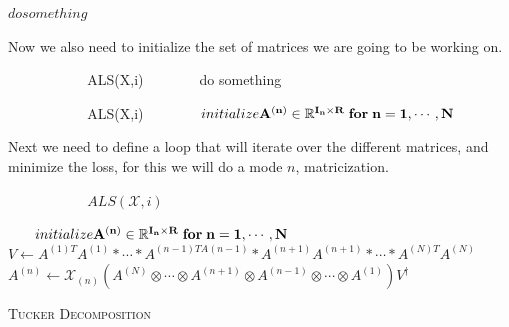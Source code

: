 \documentclass[11pt]{article}
\newcommand\0{\mathbf{0}}
\newcommand\RR{\mathbb{R}}
\newcommand\<{\langle}
\renewcommand\>{\rangle}
\begin{document}
\begin{algorithm}
\begin{algorithmic}
\State $do something$
\EndProcedure
\end{algorithmic}
\end{algorithm}

Now we also need to initialize the set of matrices we are going to be working on. 


\begin{algorithm}
\begin{algorithmic}
        \State ALS(X,i)
    \EndFor
\Else
    \State do something
\EndIf
\EndProcedure
\end{algorithmic}
\end{algorithm}

\begin{algorithm}
\begin{algorithmic}
        \State ALS(X,i)
    \EndFor
\Else
    \State $initialize \bf A^{(n)} \in \RR^{I_{n}\times R}\;for\;n=1,\cdots, N$
\EndIf
\EndProcedure
\end{algorithmic}
\end{algorithm}

Next we need to define a loop that will iterate over the different matrices, and minimize the loss, for this we will do a mode $n$, matricization.

\begin{algorithm}
\begin{algorithmic}
        \State $ALS(\mathcal{X},i)$
    \EndFor
    
\Else
    \State $initialize \bf A^{(n)} \in \RR^{I_{n}\times R}\;for\;n=1,\cdots, N$
         \State $V \gets A^{(1)T}A^{(1)}*\cdots* A^{(n-1)TA^{}(n-1)}*A^{(n+1)}A^{(n+1)}*\cdots*A^{(N)T}A^{(N)}$
         \State $A^{(n)}\gets \mathcal{X}_{(n)}(A^{(N)}\otimes \cdots \otimes A^{(n+1)} \otimes A^{(n-1)}\otimes \cdots \otimes A^{(1)})V^{\dagger}$
    \EndFor
    \EndWhile
\EndIf
\EndProcedure
\end{algorithmic}
\end{algorithm}

\textsc{Tucker Decomposition}
    
\end{document}

